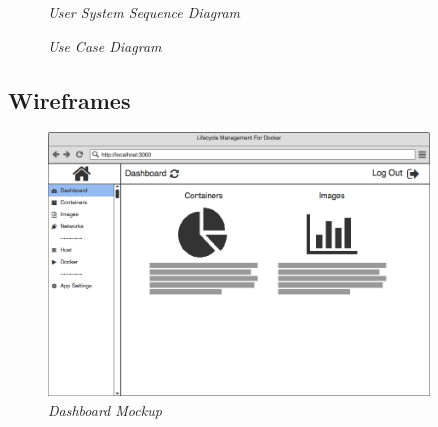 \begin{figure}[!ht]
\centering
{}
\caption{\em User System Sequence Diagram}
\end{figure}

\begin{figure}[!ht]
\centering
{}
\caption{\em Use Case Diagram}
\end{figure}

\clearpage

\subsection{Wireframes}
\label{appendix:wireframes}

\begin{figure}[!ht]
\centering
\includegraphics*[width=0.9\textwidth]{wireframes/dashboard}
\caption{\em Dashboard Mockup}
\end{figure}

